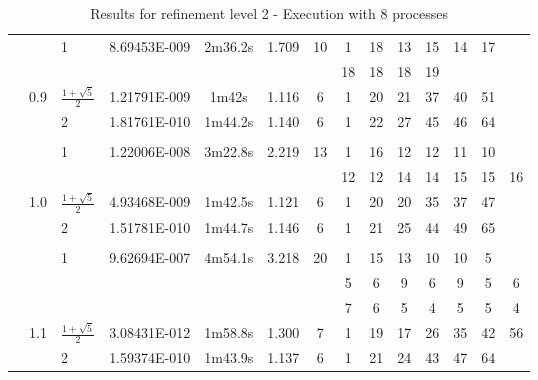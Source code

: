 \begin{sidewaystable}[p]
\begin{changemargin}{-2cm}{0cm}
\begin{tabular}{l c p{2cm} | c c c c c c c c c c c}
  \hline
 & & 1 & 8.69453E-009 & 2m36.2s & 1.709 & 10 & 1 & 18 & 13 & 15 & 14 & 17 \\
 & & & & & & & 18 & 18 & 18 & 19 \\ 
 & 0.9 & $ \frac{1 + \sqrt{5}}{2} $ & 
1.21791E-009 & 1m42s & 1.116 & 6 & 1 & 20 & 21 & 37 & 40 & 51 \\
 & & 2 & 1.81761E-010 & 1m44.2s & 1.140 & 6 & 1 & 22 & 27 & 45 & 46 & 64 \\
 & & & & \\
  \hline
 & & 1 & 1.22006E-008 & 3m22.8s & 2.219 & 13 & 1 & 16 & 12 & 12 & 11 & 10 \\
 & & & & & & & 12 & 12 & 14 & 14 & 15 & 15 & 16 \\   
& 1.0 & $ \frac{1 + \sqrt{5}}{2} $ &
4.93468E-009 & 1m42.5s & 1.121 & 6 & 1 & 20 & 20 & 35 & 37 & 47 \\
 & & 2 & 1.51781E-010 & 1m44.7s & 1.146 & 6 & 1 & 21 & 25 & 44 & 49 & 65 \\
 & & & & \\
  \hline
  & & 1 & 9.62694E-007 & 4m54.1s & 3.218 & 20 & 1 & 15 & 13 & 10 & 10 & 5 \\
  & & & & & & & 5 & 6 & 9 & 6 & 9 & 5 & 6 \\
  & & & & & & & 7 & 6 & 5 & 4 & 5 & 5 & 4 \\
& 1.1 & $ \frac{1 + \sqrt{5}}{2} $ &
3.08431E-012 & 1m58.8s & 1.300 & 7 & 1 & 19 & 17 & 26 & 35 & 42 & 56 \\
 & & 2 & 1.59374E-010 & 1m43.9s & 1.137 & 6 & 1 & 21 & 24 & 43 & 47 & 64 \\   \hline 
\end{tabular}

\end{changemargin}

\caption{ Results for refinement level 2 - Execution with 8 processes }

\end{sidewaystable}

